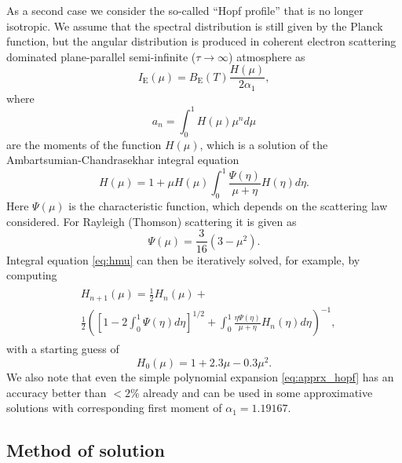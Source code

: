 \documentclass[iop, usenatbib]{emulateapj}
\begin{document}
As a second case we consider the so-called ``Hopf profile'' that is no longer isotropic.
We assume that the spectral distribution is still given by the Planck function, but the angular distribution is produced in coherent electron scattering dominated plane-parallel semi-infinite ($\tau \rightarrow \infty$) atmosphere as
\begin{equation}
  I_{\mathrm{E}}(\mu) = B_{\mathrm{E}}(T) \frac{H(\mu)}{2\alpha_1},
\end{equation}
where
\begin{equation}
  a_n = \int_0^1 H(\mu) \mu^n d\mu
\end{equation}
are the moments of the function $H(\mu)$, which is a solution of the Ambartsumian-Chandrasekhar integral equation \citep[see e.g.][]{Cha60,Sob63}
\begin{equation}\label{eq:hmu}
  H(\mu) = 1 + \mu H(\mu) \int_0^1 \frac{\Psi(\eta)}{\mu + \eta} H(\eta) d\eta.
\end{equation}
Here $\Psi(\mu)$ is the characteristic function, which depends on the scattering law considered.
For Rayleigh (Thomson) scattering it is given as
\begin{equation}
  \Psi(\mu) = \frac{3}{16}(3-\mu^2).
\end{equation}
Integral equation \eqref{eq:hmu} can then be iteratively solved, for example, by computing
\begin{align}\begin{split}
&H_{n+1}(\mu) =  \frac{1}{2} H_n(\mu) + \\ &\frac{1}{2}\left( \left[1-2\int_0^1 \Psi(\eta)d\eta \right]^{1/2} + \int_0^1 \frac{\eta \Psi(\eta)}{\mu + \eta} H_n(\eta) d\eta \right)^{-1},
\end{split}\end{align}
with a starting guess of
\begin{equation}\label{eq:apprx_hopf}
  H_0(\mu) = 1 + 2.3\mu - 0.3\mu^2.
\end{equation}
We also note that even the simple polynomial expansion \eqref{eq:apprx_hopf} has an accuracy better than $<2\%$ already and can be used in some approximative solutions with corresponding first moment of $\alpha_1 = 1.19167$.


\subsection{Method of solution}
\end{document}

